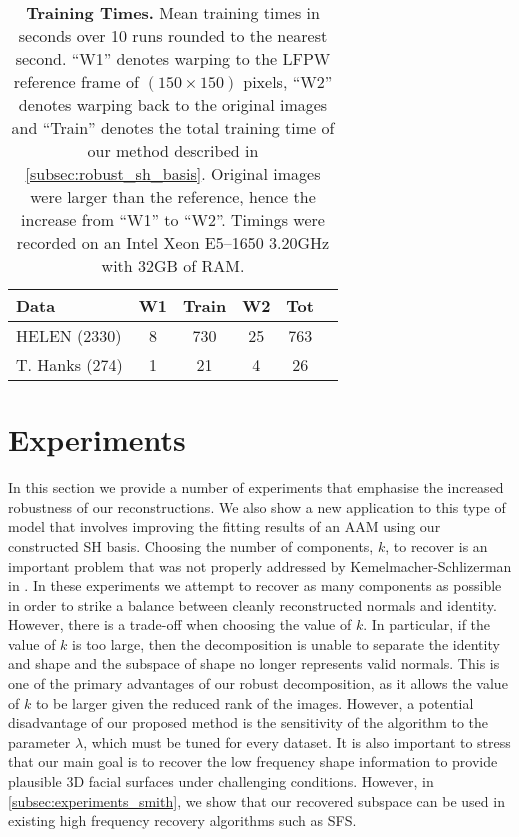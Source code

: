 \begin{table}[th]
    \centering
    \begin{tabular}{lccccc}
        \toprule
        Data   & W1 & Train & W2 & Tot \\ \midrule
        HELEN (2330)    & 8       & 730       & 25        & 763   \\
        T. Hanks (274)  & 1       & 21        & 4         & 26    \\  \bottomrule
    \end{tabular}
    \caption{\textbf{Training Times.} Mean training times in seconds over 10
             runs rounded to the nearest second. ``W1'' denotes warping to the
             LFPW reference frame of $(150 \times 150)$ pixels, ``W2'' denotes
             warping back to the original images and ``Train'' denotes the total
             training time of our method described in
             \cref{subsec:robust_sh_basis}. Original images were larger than 
             the reference, hence the increase from ``W1'' to ``W2''. Timings
             were recorded on an Intel Xeon E5--1650 3.20GHz with 32GB of RAM.}
\label{tbl:timings}
\end{table}
\section{Experiments}\label{sec:imag_coll_experiments}
In this section we provide a number of experiments that emphasise the increased
robustness of our reconstructions. We also show a new application to this type
of model that involves improving the fitting results of an AAM using our
constructed SH basis. Choosing the number of components, $k$, to recover is an
important problem that was not properly addressed by Kemelmacher-Schlizerman in
\cite{RefWorks:311}. In these experiments we attempt to recover as many
components as possible in order to strike a balance between cleanly
reconstructed normals and identity. However, there is a trade-off when choosing
the value of $k$. In particular, if the value of $k$ is too large, then the
decomposition is unable to separate the identity and shape and the subspace of
shape no longer represents valid normals. This is one of the primary advantages
of our robust decomposition, as it allows the value of $k$ to be larger given
the reduced rank of the images. However, a potential disadvantage of our
proposed method is the sensitivity of the algorithm to the parameter $\lambda$,
which must be tuned for every dataset. It is also important to stress that our
main goal is to recover the low frequency shape information to provide plausible
3D facial surfaces under challenging conditions. However, in
\cref{subsec:experiments_smith}, we show that our recovered subspace can
be used in existing high frequency recovery algorithms such as SFS.\@

